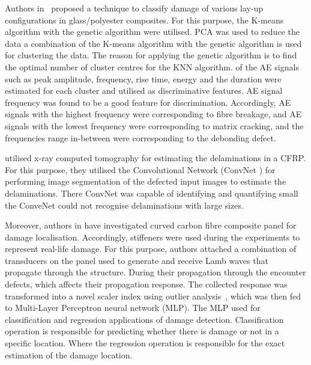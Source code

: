 Authors in~\cite{Pashmforoush2014} proposed a technique to classify damage of various lay-up configurations in glass/polyester composites.
For this purpose, the K-means algorithm with the genetic algorithm were utilised. PCA was used to reduce the data   a combination of the K-means algorithm with the genetic algorithm is used for clustering the data. 
The reason for applying the genetic algorithm is to find the optimal number of cluster centres for the KNN algorithm.
 of the AE signals such as peak amplitude, frequency, rise time, energy and the duration were estimated for each cluster and utilised as discriminative features. 
AE signal frequency was found to be a good feature for discrimination. Accordingly, AE signals with the highest frequency were corresponding to fibre breakage, and AE signals with the lowest frequency were corresponding to matrix cracking, and the frequencies range in-between were corresponding to the debonding defect. 


 utilised x-ray computed tomography for estimating the delaminations in a CFRP. For this purpose, they utilised the Convolutional Network (ConvNet ) for performing image segmentation of the defected input images to estimate the delaminations. There ConvNet was capable of identifying  and quantifying small   the ConveNet could not recognise delaminations with large sizes.

Moreover, authors in \cite{Chetwynd2008} have investigated curved carbon fibre composite panel for damage localisation. 
Accordingly, stiffeners were used during the experiments to represent real-life damage. 
For this purpose, authors attached a combination of   transducers on the panel used to generate and receive Lamb waves that propagate through the structure. 
During their propagation through the   encounter defects, which affects their propagation response. 
The collected response was transformed into a novel scaler index using outlier analysis~\cite{Beniger1980}, which was then fed to Multi-Layer Perceptron neural network (MLP). The MLP used for classification and regression applications of damage detection. Classification operation is responsible for predicting whether there is damage or not in a specific location. Where the regression operation is responsible for the exact estimation of the damage location.


